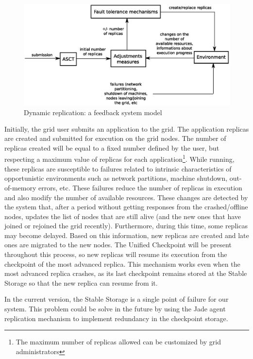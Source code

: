 \documentclass{sig-alternate}
\begin{document}
\begin{figure}[th]
\centering \includegraphics[width=1.1\columnwidth]{feedback.eps}
\caption{Dynamic replication: a feedback system model}
\label{fig:feedback}
\end{figure}
%
Initially, the grid user submits an application to the grid. The application
replicas are created and submitted for execution on the grid nodes. The number of
replicas created will be equal to a fixed number defined by the user, but
respecting a maximum value of replicas for each application\footnote{The
maximum number of replicas allowed can be customized by grid
administrators}. While running, these replicas are susceptible to failures
related to intrinsic characteristics of opportunistic environments such as
network partitions, machine shutdown, out-of-memory errors, etc. These
failures reduce the number of replicas in execution and also modify the number
of available resources. These changes are detected by the system that, after a
period without getting responses from the crashed/offline nodes, updates the
list of nodes that are still alive (and the new ones that have joined or
rejoined the grid recently). Furthermore, during this time, some
replicas may become delayed. Based on this information, new replicas are
created and late ones are migrated to the new nodes. 
The Unified Checkpoint will be present throughout this process, so new replicas will resume its execution
from the checkpoint of the most advanced replica. This mechanism works even
when the most advanced replica crashes, as its last checkpoint remains stored
at the Stable Storage so that the new replica can resume from it.

In the current version, the Stable Storage is a single point of failure for our
system. This problem could be solve in the future by using the Jade agent
replication mechanism to implement redundancy in the checkpoint storage.
\end{document}
